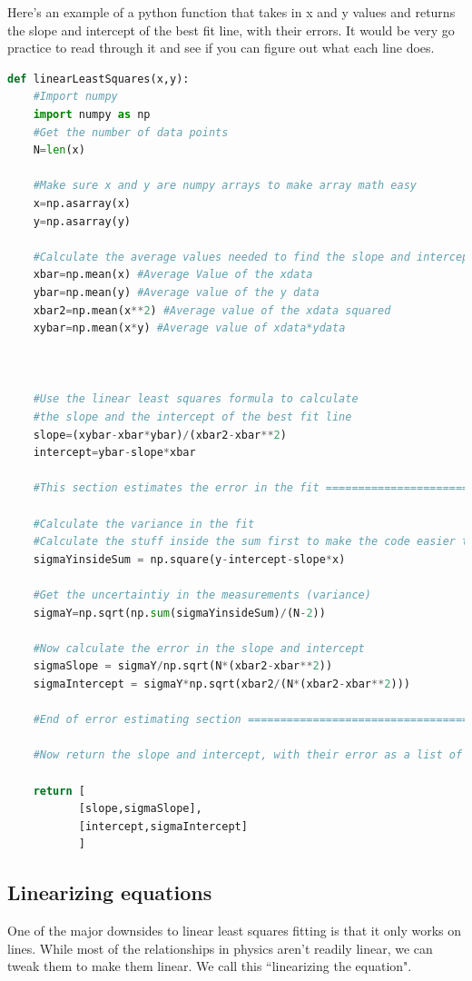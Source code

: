 \documentclass{book}
\begin{document}
Here's an example of a python function that takes in x and y values and returns the slope and intercept of the best fit line, with their errors.  It would be very go practice to read through it and see if you can figure out what each line does.
\begin{lstlisting}[language=python]
def linearLeastSquares(x,y):
    #Import numpy
    import numpy as np
    #Get the number of data points
    N=len(x)
    
    #Make sure x and y are numpy arrays to make array math easy
    x=np.asarray(x)
    y=np.asarray(y)
    
    #Calculate the average values needed to find the slope and intercept    
    xbar=np.mean(x) #Average Value of the xdata
    ybar=np.mean(y) #Average value of the y data
    xbar2=np.mean(x**2) #Average value of the xdata squared
    xybar=np.mean(x*y) #Average value of xdata*ydata
    

    
    #Use the linear least squares formula to calculate 
    #the slope and the intercept of the best fit line
    slope=(xybar-xbar*ybar)/(xbar2-xbar**2)
    intercept=ybar-slope*xbar
    
    #This section estimates the error in the fit =========================
    
    #Calculate the variance in the fit
    #Calculate the stuff inside the sum first to make the code easier to read
    sigmaYinsideSum = np.square(y-intercept-slope*x) 

    #Get the uncertaintiy in the measurements (variance)
    sigmaY=np.sqrt(np.sum(sigmaYinsideSum)/(N-2))

    #Now calculate the error in the slope and intercept
    sigmaSlope = sigmaY/np.sqrt(N*(xbar2-xbar**2))
    sigmaIntercept = sigmaY*np.sqrt(xbar2/(N*(xbar2-xbar**2)))
    
    #End of error estimating section =====================================
    
    #Now return the slope and intercept, with their error as a list of lists    
    
    return [
           [slope,sigmaSlope],
           [intercept,sigmaIntercept]       
           ]
\end{lstlisting}





\subsection{Linearizing equations}
One of the major downsides to linear least squares fitting is that it only works on lines.  While most of the relationships in physics aren't readily linear, we can tweak them to make them linear.  We call this ``linearizing the equation".
\end{document}
